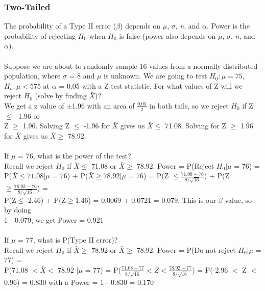 \documentclass[12pt, a4paper]{article}
\begin{document}
		\subsubsection{Two-Tailed}
		The probability of a Type II error ($\beta$) depends on $\mu$, $\sigma$, \textit{n}, and $\alpha$. Power is the probability of rejecting $H_0$ when $H_0$ is false (power also depends on $\mu$, $\sigma$, \textit{n}, and $\alpha$). \\~\\
		Suppose we are about to randomly sample 16 values from a normally distributed population, where $\sigma$ = 8 and $\mu$ is unknown. We are going to test $H_0: \mu = 75$, $H_a: \mu < 575$ at $\alpha$ = 0.05 with a Z test statistic. For what values of Z will we reject $H_0$ (solve by finding $\bar{X}$)? \\
		We get a z value of $\pm$1.96 with an area of $\frac{0.05}{2}$ in both tails, so we reject $H_0$ if Z $\leq$ -1.96 or \\ Z $\geq$ 1.96. Solving Z $\leq$ -1.96 for $\bar{X}$ gives us $\bar{X} \leq$ 71.08. Solving for Z $\geq$ 1.96 for $\bar{X}$ gives us $\bar{X} \geq$ 78.92. \\~\\
		If $\mu$ = 76, what is the power of the test? \\
		Recall we reject $H_0$ if $\bar{X} \leq$ 71.08 or $\bar{X} \geq$ 78.92. Power = P(Reject $H_0 | \mu$ = 76) = \\ P($\bar{X} \leq 71.08|\mu$ = 76) + P($\bar{X} \geq 78.92|\mu$ = 76) = P(Z $\leq \frac{71.08-76}{8/\sqrt{16}}$) + P(Z $\geq \frac{78.92-76}{8/\sqrt{16}}$) = \\ P(Z$\leq$-2.46) + P(Z$\geq$1.46) = 0.0069 + 0.0721 = 0.079. This is our $\beta$ value, so by doing \\ 1 - 0.079, we get Power = 0.921 \\~\\
		If $\mu$ = 77, what is P(Type II error)? \\
		Recall we reject $H_0$ if $\bar{X} \geq$ 78.92 or $\bar{X} \geq$ 78.92. Power = P(Do not reject $H_0 | \mu$ = 77) = \\
		P(71.08 $< \bar{X} <$ 78.92 $| \mu$ = 77) = P($\frac{71.08-77}{8/\sqrt{16}} < Z < \frac{78.92-77}{8/\sqrt{16}}$) = P(-2.96 $<$ Z $<$ 0.96) = 0.830 with a Power = 1 - 0.830 = 0.170 \newpage
		
\end{document}
